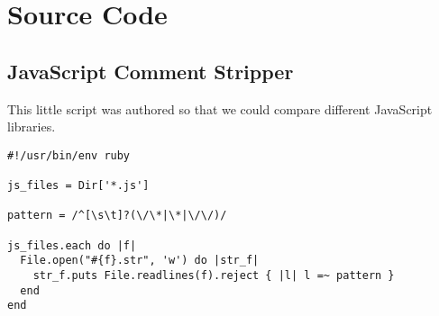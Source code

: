 \chapter{Source Code}

\section{JavaScript Comment Stripper}
\label{section:source.code.javascript.comment.stripper}

This little script was authored so that we could
compare different JavaScript libraries.

\lstset{language=Ruby}
\begin{lstlisting}
#!/usr/bin/env ruby

js_files = Dir['*.js']

pattern = /^[\s\t]?(\/\*|\*|\/\/)/

js_files.each do |f|
  File.open("#{f}.str", 'w') do |str_f| 
    str_f.puts File.readlines(f).reject { |l| l =~ pattern }
  end
end
\end{lstlisting}
